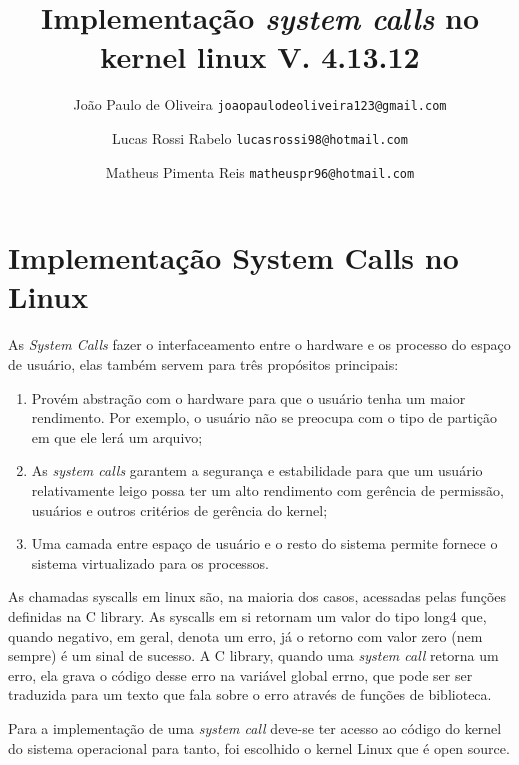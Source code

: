 \documentclass[12pt]{article}
\begin{document}
\title{Implementação \textit{system calls} no kernel linux V. 4.13.12\vspace{3.5cm}} %

\author{
	João Paulo de Oliveira
	\texttt{joaopaulodeoliveira123@gmail.com}
	\and
	Lucas Rossi Rabelo
	\texttt{lucasrossi98@hotmail.com}
	\and		
	Matheus Pimenta Reis
	\texttt{matheuspr96@hotmail.com}
	\vspace*{9cm}
}

\maketitle

\tableofcontents
\pagebreak

\section{Implementação \textbf{System Calls} no Linux}
As \textit{System Calls} fazer o interfaceamento entre o hardware e os processo do espaço de usuário, elas também servem para três propósitos principais:
\begin{enumerate}
	\item Provém abstração com o hardware para que o usuário tenha um maior rendimento. Por exemplo, o usuário não se preocupa com o tipo de partição em que ele lerá um arquivo;
	\item As \textit{system calls} garantem a segurança e estabilidade para que um usuário relativamente leigo possa ter um alto rendimento com gerência de permissão, usuários e outros critérios de gerência do kernel;
	\item Uma camada entre espaço de usuário e o resto do sistema permite fornece o sistema virtualizado para os processos.
\end{enumerate}
	As chamadas syscalls em linux são, na maioria dos casos, acessadas pelas funções definidas na C library. As syscalls em si retornam um valor do tipo long4 que, quando negativo, em geral, denota um erro, já o retorno com valor zero (nem sempre) é um sinal de sucesso. A C library, quando uma \textit{system call} retorna um erro, ela grava o código desse erro na variável global errno, que pode ser ser traduzida para um texto que fala sobre o erro através de funções de biblioteca.
	
	Para a implementação de uma \textit{system call} deve-se ter acesso ao código do kernel do sistema operacional para tanto, foi escolhido o kernel Linux que é open source.
\setcounter{secnumdepth}{-1}
\end{document}

